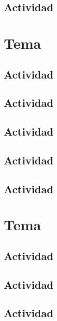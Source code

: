 \documentclass[10pt,examen]{repaso_layout}
\begin{document}
\begin{questions}
    \subsection{Actividad}
        \section{Tema}
    \subsection{Actividad}
    \subsection{Actividad}
    \subsection{Actividad}
    \subsection{Actividad}
    \subsection{Actividad}
        \section{Tema}
    \subsection{Actividad}
    \subsection{Actividad}
    \subsection{Actividad}

\end{questions}
\end{document}
